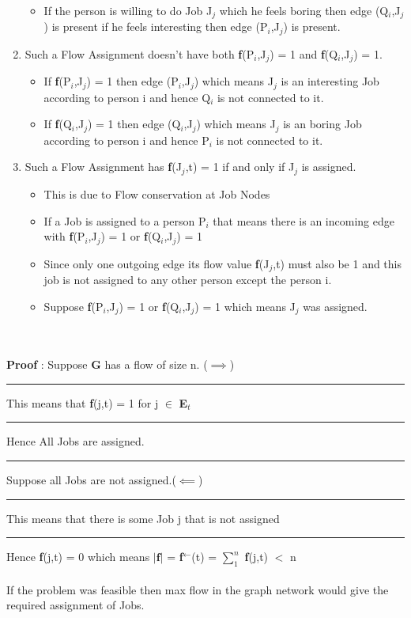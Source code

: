 \documentclass{report}
\begin{document}
\begin{enumerate}
\begin{itemize}
         \item If the person is willing to do Job J$_j$ which he feels boring then edge (Q$_i$,J$_j$) is present if he feels interesting then edge (P$_i$,J$_j$) is present.
      \end{itemize}
     \item Such a Flow Assignment doesn't have both \textbf{f}(P$_i$,J$_j$) = 1 and \textbf{f}(Q$_i$,J$_j$) = 1.
     \begin{itemize}
         \item If \textbf{f}(P$_i$,J$_j$) = 1 then edge (P$_i$,J$_j$) which means J$_j$ is an interesting Job according to person i and hence Q$_i$ is not connected to it.
         \item If \textbf{f}(Q$_i$,J$_j$) = 1 then edge (Q$_i$,J$_j$) which means J$_j$ is an boring Job according to person i and hence P$_i$ is not connected to it.
     \end{itemize}
     \item Such a Flow Assignment has \textbf{f}(J$_j$,t) = 1 if and only if J$_j$ is assigned.
     \begin{itemize}
         \item This is due to Flow conservation at Job Nodes
         \item If a Job is assigned to a person P$_i$ that means there is an incoming edge with \textbf{f}(P$_i$,J$_j$) = 1 or \textbf{f}(Q$_i$,J$_j$) = 1
         \item Since only one outgoing edge its flow value \textbf{f}(J$_j$,t) must also be 1 and this job is not assigned to any other person except the person i.
         \item Suppose \textbf{f}(P$_i$,J$_j$) = 1 or \textbf{f}(Q$_i$,J$_j$) = 1 which means J$_j$ was assigned.
     \end{itemize}
 \end{enumerate}
   \\
    \vspace*{0em}\\
 \textbf{Proof} : Suppose \textbf{G} has a flow of size n. ($\implies$)\vspace{0.5em}\\
 \rule[0.5mm]{1.1cm}{0pt} This means that \textbf{f}(j,t) = 1 for j $\in$ \textbf{E}$_t$\\
 \rule[0.5cm]{1.1cm}{0pt} Hence All Jobs are assigned.\\
 \rule[0.5cm]{1.1cm}{0pt} Suppose all Jobs are not assigned.($\impliedby$)\\
 \rule[0.5cm]{1.1cm}{0pt} This means that there is some Job j that is not assigned\\
 \rule[0.5cm]{1.1cm}{0pt} Hence \textbf{f}(j,t) = 0  which means $|\mathbf{f}|$ = \textbf{f}$^\gets$(t) = $\sum_1^n$ \textbf{f}(j,t) $<$ n\\
 \vspace*{0.5em}\\
 If the problem was feasible then max flow in the graph network would give the required assignment of Jobs.
\end{document}
